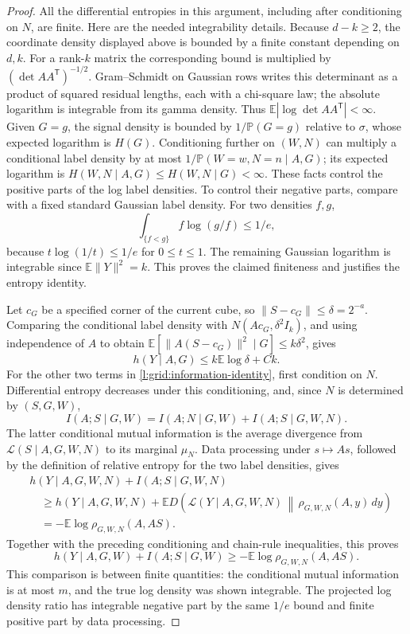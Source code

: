 \begin{proof}
All the differential entropies in this argument, including after
conditioning on $N$, are finite.  Here are the needed integrability
details.  Because $d-k\ge2$, the coordinate density displayed above is
bounded by a finite constant depending on $d,k$.  For a rank-$k$ matrix
the corresponding bound is multiplied by
$(\det AA^{\mathsf T})^{-1/2}$.  Gram--Schmidt on Gaussian rows writes
this determinant as a product of squared residual lengths, each with a
chi-square law; the absolute logarithm is integrable from its gamma density.
Thus $\mathbb E|\log\det AA^{\mathsf T}|<\infty$.  Given $G=g$, the
signal density is bounded by $1/\mathbb P(G=g)$ relative to $\sigma$,
whose expected logarithm is $H(G)$.  Conditioning further on $(W,N)$
can multiply a conditional label density by at most
$1/\mathbb P(W=w,N=n\mid A,G)$; its expected logarithm is
$H(W,N\mid A,G)\le H(W,N\mid G)<\infty$.  These facts control the
positive parts of the log label densities.  To control their negative
parts, compare with a fixed standard Gaussian label density.  For two
densities $f,g$,
\[
 \int_{\{f<g\}} f\log(g/f)\le 1/e,
\]
because $t\log(1/t)\le1/e$ for $0\le t\le1$.  The remaining Gaussian
logarithm is integrable since $\mathbb E\|Y\|^2=k$.  This proves the
claimed finiteness and justifies the entropy identity.

Let $c_G$ be a specified corner of the current cube, so
$\|S-c_G\|\le\delta=2^{-a}$.  Comparing the conditional label density
with $N(Ac_G,\delta^2I_k)$, and using independence of $A$ to obtain
$\mathbb E[\|A(S-c_G)\|^2\mid G]\le k\delta^2$, gives
\begin{equation}\label{l:grid:upper-entropy}
 h(Y\mid A,G)\le k\mathbb E\log\delta+Ck.
\end{equation}
For the other two terms in \eqref{l:grid:information-identity}, first
condition on $N$.  Differential entropy decreases under this
conditioning, and, since $N$ is determined by $(S,G,W)$,
\[
 I(A;S\mid G,W)=I(A;N\mid G,W)+I(A;S\mid G,W,N).
\]
The latter conditional mutual information is the average divergence
from $\mathcal L(S\mid A,G,W,N)$ to its marginal $\mu_N$.
Data processing under $s\mapsto As$, followed by the definition of
relative entropy for the two label densities, gives
\begin{align*}
 &h(Y\mid A,G,W,N)+I(A;S\mid G,W,N)\\
 &\quad\ge h(Y\mid A,G,W,N)
  +\mathbb E D\!\left(\mathcal L(Y\mid A,G,W,N)
       \,\middle\|\,\rho_{G,W,N}(A,y)\,dy\right)\\
 &\quad=-\mathbb E\log\rho_{G,W,N}(A,AS).
\end{align*}
Together with the preceding conditioning and chain-rule inequalities,
this proves
\begin{equation}\label{l:grid:lower-bracket}
 h(Y\mid A,G,W)+I(A;S\mid G,W)
 \ge-\mathbb E\log\rho_{G,W,N}(A,AS).
\end{equation}
This comparison is between finite quantities: the conditional mutual
information is at most $m$, and the true log density was shown integrable.
The projected log density ratio has integrable negative part by the same
$1/e$ bound and finite positive part by data processing.


\end{proof}
